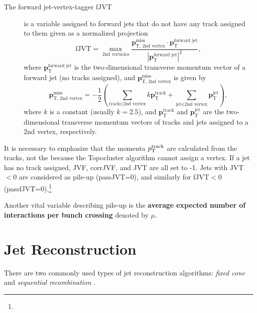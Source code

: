 \begin{description}
    \item[The forward jet-vertex-tagger fJVT] \cite{fjvt} is a variable assigned to forward jets that do not have any track assigned to them given as a normalized projection 
    \begin{equation}
        \label{eq:fjvt}
        \text{fJVT} = \max_{\text{2nd verticies}}{\frac{\textbf{p}^{\text{miss}}_{\text{T, 2nd vertex}} \cdot \textbf{p}_{\text{T}}^{\text{forward jet}}}{|\textbf{p}_{\text{T}}^{\text{forward jet}}|^2}},
    \end{equation}
    where $\textbf{p}_{\text{T}}^{\text{forward jet}}$ is the two-dimensional transverse momentum vector of a forward jet (no tracks assigned), and $\textbf{p}_{\text{T, 2nd vertex}}^{\text{miss}}$ is given by
    \begin{equation}
        \textbf{p}_{\text{T, 2nd vertex}}^{\text{miss}} = -\frac12\left(\sum_{\text{track} \in \text{2nd vertex}} k\textbf{p}_{\text{T}}^{\text{track}} 
        + \sum_{\text{jet} \in \text{2nd vertex} }\textbf{p}_{\text{T}}^{\text{jet}}\right),
    \end{equation}
    where $k$ is a constant (usually $k=2.5$), and $\textbf{p}_{\text{T}}^{\text{track}}$ and $\textbf{p}_{\text{T}}^{\text{jet}}$ are the two-dimensional transverse momentum vectors of tracks and jets assigned to a 2nd vertex, respectively.
\end{description}

It is necessary to emphasize that the momenta $p_\text{T}^{\text{track}}$ are calculated from the tracks, not the \PFOs because the Topocluster algorithm cannot assign a vertex.
If a jet has no track assigned, JVF, corrJVF, and JVT are all set to -1.
Jets with JVT$< 0$ are considered as pile-up (passJVT=0), and similarly for fJVT$<0$ (passfJVT=0).\footnote{}

Another vital variable describing pile-up is the \textbf{average expected number of interactions per bunch crossing} denoted by $\mu$.

\section{Jet Reconstruction}
\label{sec:jet_reco}
There are two commonly used types of jet reconstruction algorithms: \emph{fixed cone} and \emph{sequential recombination} \cite{jet_reco_rev}.

